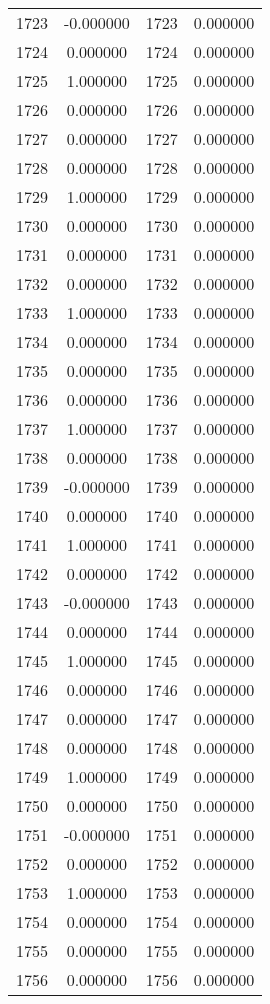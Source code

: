 \documentclass[12pt]{article}
\begin{document}
\begin{longtable}{@{}cccc@{}}
1723 & -0.000000 & 1723 & 0.000000 \\
1724 & 0.000000 & 1724 & 0.000000 \\
1725 & 1.000000 & 1725 & 0.000000 \\
1726 & 0.000000 & 1726 & 0.000000 \\
1727 & 0.000000 & 1727 & 0.000000 \\
1728 & 0.000000 & 1728 & 0.000000 \\
1729 & 1.000000 & 1729 & 0.000000 \\
1730 & 0.000000 & 1730 & 0.000000 \\
1731 & 0.000000 & 1731 & 0.000000 \\
1732 & 0.000000 & 1732 & 0.000000 \\
1733 & 1.000000 & 1733 & 0.000000 \\
1734 & 0.000000 & 1734 & 0.000000 \\
1735 & 0.000000 & 1735 & 0.000000 \\
1736 & 0.000000 & 1736 & 0.000000 \\
1737 & 1.000000 & 1737 & 0.000000 \\
1738 & 0.000000 & 1738 & 0.000000 \\
1739 & -0.000000 & 1739 & 0.000000 \\
1740 & 0.000000 & 1740 & 0.000000 \\
1741 & 1.000000 & 1741 & 0.000000 \\
1742 & 0.000000 & 1742 & 0.000000 \\
1743 & -0.000000 & 1743 & 0.000000 \\
1744 & 0.000000 & 1744 & 0.000000 \\
1745 & 1.000000 & 1745 & 0.000000 \\
1746 & 0.000000 & 1746 & 0.000000 \\
1747 & 0.000000 & 1747 & 0.000000 \\
1748 & 0.000000 & 1748 & 0.000000 \\
1749 & 1.000000 & 1749 & 0.000000 \\
1750 & 0.000000 & 1750 & 0.000000 \\
1751 & -0.000000 & 1751 & 0.000000 \\
1752 & 0.000000 & 1752 & 0.000000 \\
1753 & 1.000000 & 1753 & 0.000000 \\
1754 & 0.000000 & 1754 & 0.000000 \\
1755 & 0.000000 & 1755 & 0.000000 \\
1756 & 0.000000 & 1756 & 0.000000 \\

\end{longtable}
\end{document}
